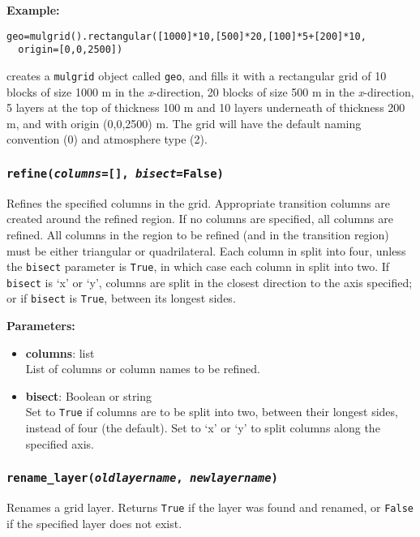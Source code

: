 \textbf{Example:}

\begin{verbatim}
geo=mulgrid().rectangular([1000]*10,[500]*20,[100]*5+[200]*10,
  origin=[0,0,2500])
\end{verbatim}

creates a \texttt{mulgrid} object called \texttt{geo}, and fills it with a rectangular grid of 10 blocks of size 1000 m in the \emph{x}-direction, 20 blocks of size 500 m in the \emph{x}-direction, 5 layers at the top of thickness 100 m and 10 layers underneath of thickness 200 m, and with origin (0,0,2500) m.  The grid will have the default naming convention (0) and atmosphere type (2).

\subsubsection{\texttt{refine(\emph{columns}=[], \emph{bisect}=False)}}

Refines the specified columns in the grid.  Appropriate transition columns are created around the refined region.  If no columns are specified, all columns are refined.  All columns in the region to be refined (and in the transition region) must be either triangular or quadrilateral.  Each column in split into four, unless the \texttt{bisect} parameter is \texttt{True}, in which case each column in split into two.  If \texttt{bisect} is `x' or `y', columns are split in the closest direction to the axis specified; or if \texttt{bisect} is \texttt{True}, between its longest sides.

\textbf{Parameters:}
\begin{itemize}
  \item \textbf{columns}: list\\
    List of columns or column names to be refined.
  \item \textbf{bisect}: Boolean or string\\
    Set to \texttt{True} if columns are to be split into two, between their longest sides, instead of four (the default).  Set to `x' or `y' to split columns along the specified axis.
\end{itemize}

\subsubsection{\texttt{rename\_layer(\emph{oldlayername}, \emph{newlayername})}}

Renames a grid layer.  Returns \texttt{True} if the layer was found and renamed, or \texttt{False} if the specified layer does not exist.

